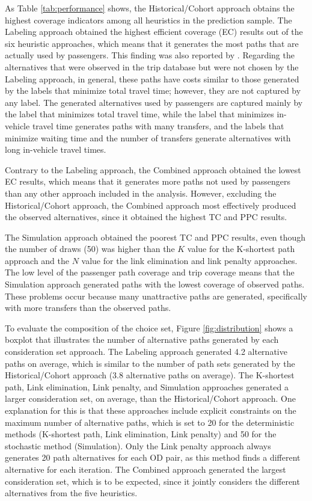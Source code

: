 \documentclass[12pt,a4paper]{article}
\begin{document}
As Table \ref{tab:performance} shows, the Historical/Cohort approach obtains the highest coverage indicators among all heuristics in the prediction sample. The Labeling approach obtained the highest efficient coverage (EC) results out of the six heuristic approaches, which means that it generates the most paths that are actually used by passengers. This finding was also reported by \citep{rui2016modeling}. Regarding the alternatives that were observed in the trip database but were not chosen by the Labeling approach, in general, these paths have costs similar to those generated by the labels that minimize total travel time; however, they are not captured by any label. The generated alternatives used by passengers are captured mainly by the label that minimizes total travel time, while the label that minimizes in-vehicle travel time generates paths with many transfers, and the labels that minimize waiting time and the number of transfers generate alternatives with long in-vehicle travel times. 

Contrary to the Labeling approach, the Combined approach obtained the lowest EC results, which means that it generates more paths not used by passengers than any other approach included in the analysis. However, excluding the Historical/Cohort approach, the Combined approach most effectively produced the observed alternatives, since it obtained the highest TC and PPC results.

The Simulation approach obtained the poorest TC and PPC results, even though the number of draws (50) was higher than the $K$ value for the K-shortest path approach and the $N$ value for the link elimination and link penalty approaches. The low level of the passenger path coverage and trip coverage means that the Simulation approach generated paths with the lowest coverage of observed paths. These problems occur because many unattractive paths are generated, specifically with more transfers than the observed paths. 

To evaluate the composition of the choice set, Figure \ref{fig:distribution} shows a boxplot that illustrates the number of alternative paths generated by each consideration set approach. The Labeling approach generated 4.2 alternative paths on average, which is similar to the number of path sets generated by the Historical/Cohort approach (3.8 alternative paths on average). The K-shortest path, Link elimination, Link penalty, and Simulation approaches generated a larger consideration set, on average, than the Historical/Cohort approach. One explanation for this is that these approaches include explicit constraints on the maximum number of alternative paths, which is set to 20 for the deterministic methods (K-shortest path, Link elimination, Link penalty) and 50 for the stochastic method (Simulation). Only the Link penalty approach always generates 20 path alternatives for each OD pair, as this method finds a different alternative for each iteration. The Combined approach generated the largest consideration set, which is to be expected, since it jointly considers the different alternatives from the five heuristics.
\end{document}
